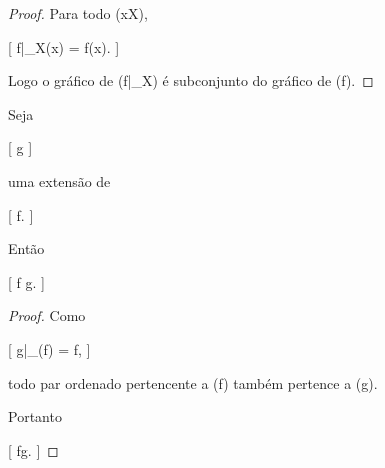 \begin{proof}

	Para todo (x\in X),

	[
			f|_X(x)
			=
			f(x).
		]

	Logo o gráfico de (f|_X) é subconjunto do gráfico de (f).

\end{proof}

\begin{prop}
	\label{prop:matematica:funcoes:restricoes-e-extensoes:extensao-inclusao}

	Seja

		[
			g
		]

	uma extensão de

		[
			f.
		]

	Então

	[
	f
	\subseteq
	g.
	]

\end{prop}

\begin{proof}

	Como

	[
	g|_{(f)}
	=
	f,
	]

	todo par ordenado pertencente a (f) também pertence a (g).

	Portanto

		[
			f\subseteq g.
		]

\end{proof}


